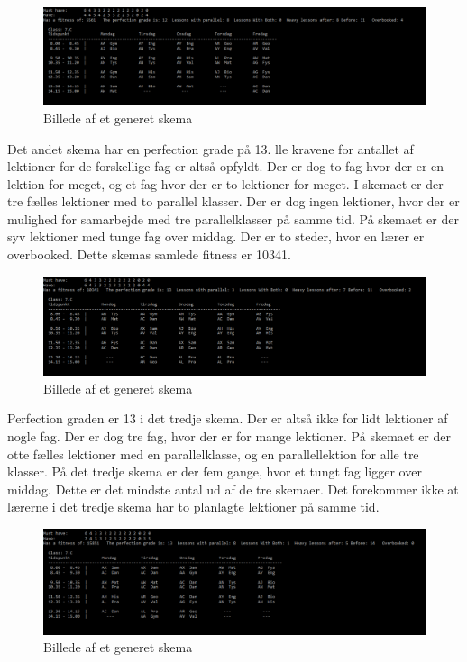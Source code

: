 \begin{figure}[!h]
\includegraphics[width=\textwidth]{partials/graphics/fitness1.png}
\caption{Billede af et generet skema}
\label{fitness1}
\end{figure}

Det andet skema har en perfection grade på 13. lle kravene for antallet af lektioner for de forskellige fag er altså opfyldt. Der er dog to fag hvor der er en lektion for meget, og et fag hvor der er to lektioner for meget. I skemaet er der tre fælles lektioner med to parallel klasser. Der er dog ingen lektioner, hvor der er mulighed for samarbejde med tre parallelklasser på samme tid. På skemaet er der syv lektioner med tunge fag over middag. Der er to steder, hvor en lærer er overbooked. Dette skemas samlede fitness er 10341.
\begin{figure}[!h]
\includegraphics[width=\textwidth]{partials/graphics/fitness2.png}
\caption{Billede af et generet skema}
\label{fitness2}
\end{figure}

Perfection graden er 13 i det tredje skema. Der er altså ikke for lidt lektioner af nogle fag. Der er dog tre fag, hvor der er for mange lektioner. På skemaet er der otte fælles lektioner med en parallelklasse, og en parallellektion for alle tre klasser. På det tredje skema er der fem gange, hvor et tungt fag ligger over middag. Dette er det mindste antal ud af de tre skemaer. Det forekommer ikke at lærerne i det tredje skema har to planlagte lektioner på samme tid. 
\begin{figure}[!h]
\includegraphics[width=\textwidth]{partials/graphics/fitness3.png}
\caption{Billede af et generet skema}
\label{fitness3}
\end{figure}

